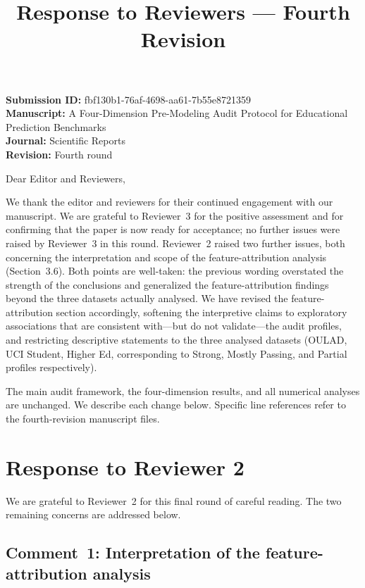 \documentclass[10pt,letterpaper]{article}
\title{\vspace*{-0.8in}\textbf{Response to Reviewers --- Fourth Revision}}
\author{}
\date{}
\begin{document}
\maketitle

\noindent\textbf{Submission ID:} fbf130b1-76af-4698-aa61-7b55e8721359\\
\textbf{Manuscript:} A Four-Dimension Pre-Modeling Audit Protocol for Educational Prediction Benchmarks\\
\textbf{Journal:} Scientific Reports\\
\textbf{Revision:} Fourth round

\vspace{0.2in}
\noindent Dear Editor and Reviewers,

We thank the editor and reviewers for their continued engagement with our
manuscript. We are grateful to Reviewer~3 for the positive assessment
and for confirming that the paper is now ready for acceptance; no
further issues were raised by Reviewer~3 in this round. Reviewer~2
raised two further issues, both concerning the interpretation and scope
of the feature-attribution analysis (Section~3.6). Both points are
well-taken: the previous wording overstated the strength of the
conclusions and generalized the feature-attribution findings beyond the
three datasets actually analysed. We have revised the feature-attribution
section accordingly, softening the interpretive claims to exploratory
associations that are consistent with---but do not validate---the audit
profiles, and restricting descriptive statements to the three analysed
datasets (OULAD, UCI Student, Higher Ed, corresponding to Strong, Mostly
Passing, and Partial profiles respectively).

The main audit framework, the four-dimension results, and all numerical
analyses are unchanged. We describe each change below. Specific line
references refer to the fourth-revision manuscript files.

\section*{Response to Reviewer 2}

We are grateful to Reviewer~2 for this final round of careful reading.
The two remaining concerns are addressed below.

\subsection*{Comment~1: Interpretation of the feature-attribution analysis}
\end{document}
